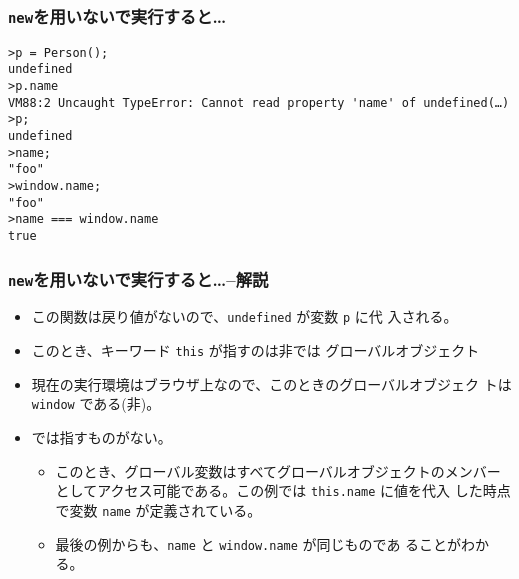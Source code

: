 \begin{frame}[containsverbatim]
 \frametitle{\protect\texttt{new}を用いないで実行すると\dots}
 {\small
\begin{Verbatim}
>p = Person();
undefined
>p.name
VM88:2 Uncaught TypeError: Cannot read property 'name' of undefined(…)
>p;
undefined
>name;
"foo"
>window.name;
"foo"
>name === window.name
true
\end{Verbatim}
 }
\end{frame}
\begin{frame}[containsverbatim]
\frametitle{\protect\texttt{new}を用いないで実行すると\dots--解説}
\begin{itemize}
 \item この関数は戻り値がないので、\Verb+undefined+ が変数 \Verb+p+ に代
       入される。
 \item このとき、キーワード \Verb+this+ が指すのは非\Strict では
       グローバルオブジェクト
 \item 現在の実行環境はブラウザ上なので、このときのグローバルオブジェク
       トは \Verb+window+ である(非\Strict)。
 \item \Strict では指すものがない。
 \begin{itemize}
  \item このとき、グローバル変数はすべてグローバルオブジェクトのメンバー
	としてアクセス可能である。この例では \Verb+this.name+ に値を代入
	した時点で変数 \Verb+name+ が定義されている。
  \item 最後の例からも、\Verb+name+ と \Verb+window.name+ が同じものであ
	ることがわかる。
 \end{itemize}
\end{itemize}
\end{frame}
